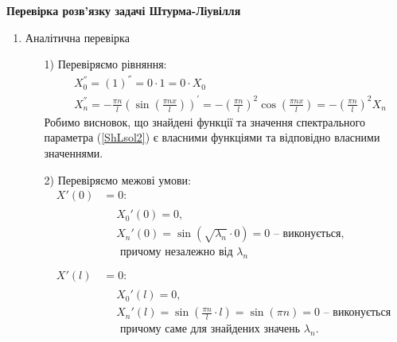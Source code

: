 \begin{center}
    \large{\textbf{Перевірка розв'язку задачі Штурма-Ліувілля}}
\end{center}

\begin{enumerate}[wide, labelindent=0pt]
    \item Аналітична перевірка
    \begin{enumerate}
        \item[1)] Перевіряємо рівняння:
        \begin{equation*}
            \begin{aligned}
                &X_0^{''} = \left(1\right)^{''} = 0 \cdot 1 = 0 \cdot X_0\\
                &X_n^{''} = -\frac{\pi n}{l} \left(\sin\left(\frac{\pi n x}{l}\right)\right)^{'} = -\left(\frac{\pi n}{l}\right)^2 \cos\left(\frac{\pi n x}{l}\right) = -\left(\frac{\pi n}{l}\right)^2 X_n
            \end{aligned}
        \end{equation*}
        Робимо висновок, що знайдені функції та значення спектрального параметра (\ref{ShLsol2}) є власними функціями та відповідно власними значеннями.
        \item[2)] Перевіряємо межові умови:
        \begin{equation*}
            \begin{aligned}
                X'(0) &=  0:\\
                &\begin{aligned}
                    &X_0'(0) = 0,\\
                    &X_n'(0) = \sin(\sqrt{\lambda_n} \cdot 0) = 0 \text{ -- виконується,}\\
                    &\text{ причому незалежно від }\lambda_n
                \end{aligned}\\
                \\
                X'(l) &= 0:\\
                &\begin{aligned}
                    &X_0'(l) = 0,\\
                    &X_n'(l) = \sin\left(\frac{\pi n}{l} \cdot l\right) = \sin(\pi n) = 0 \text{ -- виконується}\\
                    &\text{ причому саме для знайдених значень }\lambda_n.
                \end{aligned}\\

\end{aligned}
\end{equation*}
\end{enumerate}
\end{enumerate}
